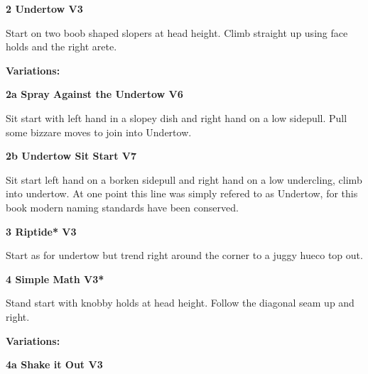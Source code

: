 \begin{multicols}{2}
					\label{rt:Undertow}
\colorbox{green!20}{
\parbox{0.95\linewidth}{
\textbf{
2 Undertow V3     
}
}
}

					\begin{adjustwidth}{0.5cm}{}				
					Start on two boob shaped slopers at head height. Climb straight up using face holds and the right arete.
					\end{adjustwidth}
						\begin{adjustwidth}{0.5cm}{}				
						\textbf{Variations:} \newline
							\label{vr:Spray Against the Undertow}
\colorbox{RoyalBlue!20}{
\parbox{0.95\linewidth}{
\textbf{
2a Spray Against the Undertow V6  
}
}
}

							\begin{adjustwidth}{0.5cm}{}				
							Sit start with left hand in a slopey dish and right hand on a low sidepull. Pull some bizzare moves to join into Undertow.
							\end{adjustwidth}
							\label{vr:Undertow Sit Start}
\colorbox{Goldenrod!50}{
\parbox{0.95\linewidth}{
\textbf{
2b Undertow Sit Start V7     
}
}
}

							\begin{adjustwidth}{0.5cm}{}				
							Sit start left hand on a borken sidepull and right hand on a low undercling, climb into undertow. At one point this line was simply refered to as Undertow, for this book modern naming standards have been conserved.
							\end{adjustwidth}
						\end{adjustwidth}
					\label{rt:Riptide}
\colorbox{green!20}{
\parbox{0.95\linewidth}{
\textbf{
3 Riptide* V3    
}
}
}

					\begin{adjustwidth}{0.5cm}{}				
					Start as for undertow but trend right around the corner to a juggy hueco top out.
					\end{adjustwidth}
					\label{rt:Simple Math}
\colorbox{green!20}{
\parbox{0.95\linewidth}{
\textbf{
4 Simple Math V3*  
}
}
}

					\begin{adjustwidth}{0.5cm}{}				
					Stand start with knobby holds at head height. Follow the diagonal seam up and right.
					\end{adjustwidth}
						\begin{adjustwidth}{0.5cm}{}				
						\textbf{Variations:} \newline
							\label{vr:Shake it Out}
\colorbox{green!20}{
\parbox{0.95\linewidth}{
\textbf{
4a Shake it Out V3   
}
}
}


\end{adjustwidth}
\end{multicols}
